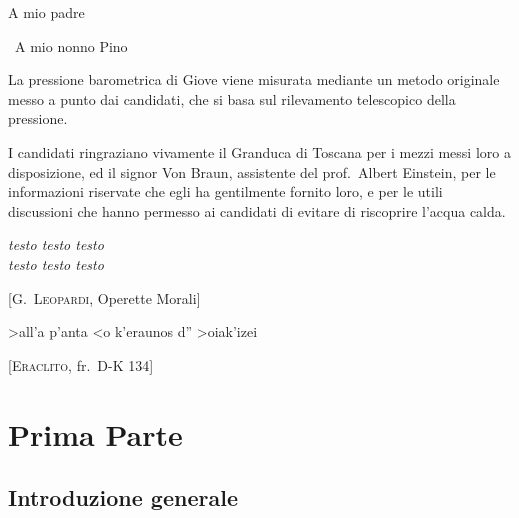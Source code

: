 \documentclass[%
    corpo=11pt,
    twoside,
    oldstyle,
    autoretitolo,
    tipotesi=dottorale,
    greek,
    evenboxes,
]{toptesi}
\begin{document}
\ifclassica%
{\begin{dedica}
    A mio padre

    \textdagger\ A mio nonno Pino
\end{dedica}\fi

\sommario

La pressione barometrica di Giove viene misurata
mediante un metodo originale  messo a punto dai candidati, che si basa
sul rilevamento telescopico della pressione.


\ringraziamenti

I candidati ringraziano vivamente il Granduca di Toscana per i mezzi
messi loro a disposizione, ed il signor Von Braun, assistente del
prof.~Albert Einstein, per le informazioni riservate che egli ha
gentilmente fornito loro, e per le utili discussioni che hanno permesso
ai candidati di evitare di riscoprire l'acqua calda.

\tablespagetrue\figurespagetrue %
\indici

\ifclassica   
\begin{citazioni}
    \textit{testo testo testo\\testo testo testo}

    [\textsc{G.\ Leopardi}, Operette Morali]\vspace{1em}

    \textgreek{>all'a p'anta <o k'eraunos d'' >oiak'izei}

    [\textsc{Eraclito}, fr.\ D-K 134]
\end{citazioni}

\fi
\mainmatter

\part{Prima Parte}
\chapter{Introduzione generale}

}
\end{document}
